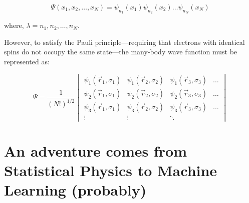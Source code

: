 \begin{equation}
    \Psi(x_1,x_2,\dots,x_N)=\psi_{n_1}(x_1)\psi_{n_2}(x_2)\dots\psi_{n_N}(x_N)
    \label{body_function}
\end{equation}

where, $\lambda={n_1,n_2,\dots,n_N}$.

However, to satisfy the Pauli principle—requiring that electrons with identical spins do not occupy the same state—the many-body wave function must be represented as:

\begin{equation}
    \Psi = \frac{1}{(N!)^{1/2}}
    \begin{vmatrix}
    \psi_1(\Vec{r}_1,\sigma_1) & \psi_1(\Vec{r}_2,\sigma_2) & \psi_1(\Vec{r}_3,\sigma_3) & \dots \\
    \psi_2(\Vec{r}_1,\sigma_1) & \psi_2(\Vec{r}_2,\sigma_2) & \psi_2(\Vec{r}_3,\sigma_3) & \dots \\
    \psi_3(\Vec{r}_1,\sigma_1) & \psi_3(\Vec{r}_2,\sigma_2) & \psi_3(\Vec{r}_3,\sigma_3) & \dots \\
    \vdots & \vdots & \ddots
    \end{vmatrix}
\end{equation}

\newpage
\section{An adventure comes from Statistical Physics to Machine Learning (probably)}

